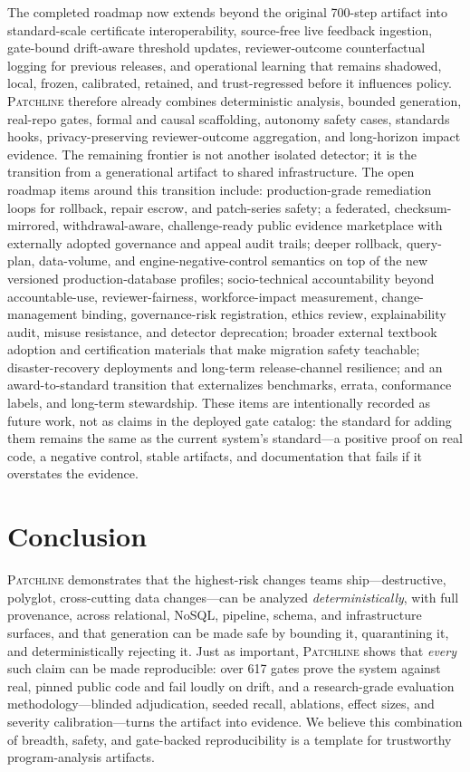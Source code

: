 \documentclass[11pt]{article}
\newcommand{\tool}{\textsc{Patchline}}
\begin{document}
The completed roadmap now extends beyond the original 700-step artifact into standard-scale certificate
interoperability, source-free live feedback ingestion, gate-bound drift-aware threshold updates,
reviewer-outcome counterfactual logging for previous releases, and operational learning that remains
shadowed, local, frozen, calibrated, retained, and trust-regressed before it influences policy.
\tool{} therefore already combines
deterministic analysis, bounded generation, real-repo gates, formal and causal scaffolding, autonomy
safety cases, standards hooks, privacy-preserving reviewer-outcome aggregation, and long-horizon impact
evidence. The remaining frontier is not another isolated detector; it is the transition from a
generational artifact to shared infrastructure. The open roadmap items around this transition include:
production-grade remediation loops for rollback, repair escrow, and patch-series safety; a
federated, checksum-mirrored, withdrawal-aware, challenge-ready public evidence marketplace with
externally adopted governance and appeal audit trails; deeper rollback, query-plan, data-volume, and engine-negative-control semantics
on top of the new versioned production-database profiles;
socio-technical accountability beyond accountable-use, reviewer-fairness, workforce-impact measurement,
change-management binding, governance-risk registration, ethics review, explainability audit, misuse resistance, and detector
deprecation; broader external textbook adoption and certification materials that make migration safety teachable; disaster-recovery
deployments and long-term release-channel resilience; and an award-to-standard transition that externalizes benchmarks,
errata, conformance labels, and long-term stewardship. These items are intentionally recorded as future
work, not as claims in the deployed gate catalog: the standard for adding them remains the same as the
current system's standard---a positive proof on real code, a negative control, stable artifacts, and
documentation that fails if it overstates the evidence.

\section{Conclusion}

\tool{} demonstrates that the highest-risk changes teams ship---destructive, polyglot, cross-cutting
data changes---can be analyzed \emph{deterministically}, with full provenance, across relational,
NoSQL, pipeline, schema, and infrastructure surfaces, and that generation can be made safe by bounding
it, quarantining it, and deterministically rejecting it. Just as important, \tool{} shows that
\emph{every} such claim can be made reproducible: over 617 gates prove the system against real, pinned
public code and fail loudly on drift, and a research-grade evaluation methodology---blinded
adjudication, seeded recall, ablations, effect sizes, and severity calibration---turns the artifact
into evidence. We believe this combination of breadth, safety, and gate-backed reproducibility is a
template for trustworthy program-analysis artifacts.
\end{document}
